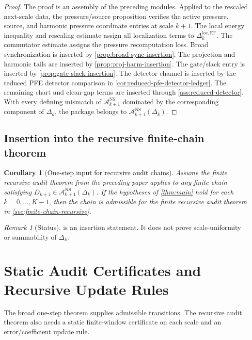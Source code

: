 \documentclass[11pt]{article}
\numberwithin{equation}{section}
\theoremstyle{plain}
\newtheorem{corollary}[theorem]{Corollary}
\theoremstyle{definition}
\theoremstyle{remark}
\newtheorem{remark}[theorem]{Remark}
\newcommand{\NS}{\mathrm{NS}}
\newcommand{\EF}{\mathrm{EF}}
\newcommand{\A}{\mathcal A}
\begin{document}
\begin{proof}
The proof is an assembly of the preceding modules.  Applied to the rescaled
next-scale data, the pressure/source proposition verifies the active pressure,
source, and harmonic pressure coordinate entries at scale \(k+1\).  The local energy inequality and
rescaling estimate assign all localization terms to
\(\Delta_k^{\mathrm{loc},\EF}\).  The commutator estimate assigns the pressure
recomputation loss.  Broad synchronization is inserted by
\cref{prop:broad-sync-insertion}.  The projection and harmonic tails are
inserted by \cref{prop:proj-harm-insertion}.  The gate/slack entry is inserted
by \cref{prop:gate-slack-insertion}.  The detector channel is inserted by the
reduced PFE detector comparison in \cref{cor:reduced-pfe-detector-ledger}.
The remaining chart and clean-gap terms are inserted through
\cref{ass:reduced-detector}.  With every defining mismatch of
\(\A_{k+1}^{\NS}\) dominated by the corresponding component of \(\Delta_k\),
the package belongs to \(\A_{k+1}^{\NS}(\Delta_k)\).
\end{proof}

\subsection{Insertion into the recursive finite-chain theorem}

\begin{corollary}[One-step input for recursive audit chains]
\label{cor:recursive-insertion}
Assume the finite recursive audit theorem from the preceding paper applies to
any finite chain satisfying \(D_{k+1}\in\A_{k+1}^{\NS}(\Delta_k)\).  If the
hypotheses of \cref{thm:main} hold for each \(k=0,\ldots,K-1\), then the chain
is admissible for the finite recursive audit theorem in \cref{sec:finite-chain-recursive}.
\end{corollary}

\begin{remark}[Status]
 is an insertion statement.  It does not prove
scale-uniformity or summability of \(\Delta_k\).
\end{remark}



\section{Static Audit Certificates and Recursive Update Rules}
\label{sec:static-recursive-rules}

The broad one-step theorem supplies admissible transitions.  The recursive audit theorem also needs a static finite-window certificate on each scale and an error/coefficient update rule.
\end{document}
